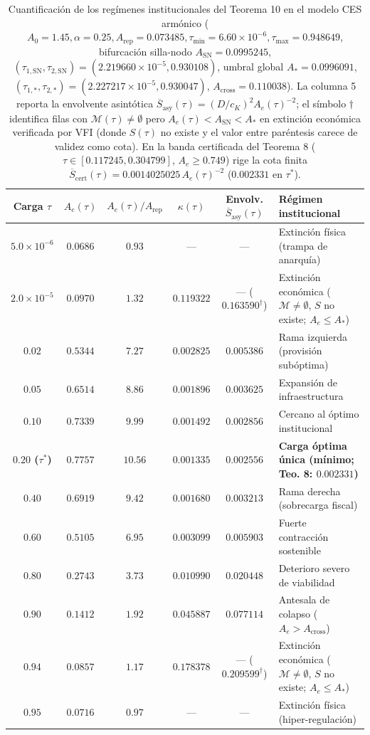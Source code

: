 \documentclass[11pt,letterpaper]{article}
\theoremstyle{plain}
\begin{document}
\begin{table}[htbp]
\centering
\small
\begin{tabular}{@{}cccccl@{}}
\toprule
\textbf{Carga $\tau$} & $A_e(\tau)$ & $A_e(\tau)/A_{\mathrm{rep}}$ & $\kappa(\tau)$ & \textbf{Envolv. $\overline{S}_{\mathrm{asy}}(\tau)$} & \textbf{Régimen institucional} \\
\midrule
$5.0\times 10^{-6}$ & $0.0686$ & $0.93$ & --- & --- & Extinción física (trampa de anarquía) \\
$2.0\times 10^{-5}$ & $0.0970$ & $1.32$ & $0.119322$ & --- ($0.163590^\dagger$) & Extinción económica ($\mathcal{M}\neq\emptyset$, $S$ no existe; $A_e\le A_*$) \\
$0.02$ & $0.5344$ & $7.27$ & $0.002825$ & $0.005386$ & Rama izquierda (provisión subóptima) \\
$0.05$ & $0.6514$ & $8.86$ & $0.001896$ & $0.003625$ & Expansión de infraestructura \\
$0.10$ & $0.7339$ & $9.99$ & $0.001492$ & $0.002856$ & Cercano al óptimo institucional \\
\textbf{$0.20$ ($\tau^*$)} & \textbf{$0.7757$} & \textbf{$10.56$} & \textbf{$0.001335$} & \textbf{$0.002556$} & \textbf{Carga óptima única (mínimo; Teo. 8: $0.002331$)} \\
$0.40$ & $0.6919$ & $9.42$ & $0.001680$ & $0.003213$ & Rama derecha (sobrecarga fiscal) \\
$0.60$ & $0.5105$ & $6.95$ & $0.003099$ & $0.005903$ & Fuerte contracción sostenible \\
$0.80$ & $0.2743$ & $3.73$ & $0.010990$ & $0.020448$ & Deterioro severo de viabilidad \\
$0.90$ & $0.1412$ & $1.92$ & $0.045887$ & $0.077114$ & Antesala de colapso ($A_e > A_{\mathrm{cross}}$) \\
$0.94$ & $0.0857$ & $1.17$ & $0.178378$ & --- ($0.209599^\dagger$) & Extinción económica ($\mathcal{M}\neq\emptyset$, $S$ no existe; $A_e\le A_*$) \\
$0.95$ & $0.0716$ & $0.97$ & --- & --- & Extinción física (hiper-regulación) \\
\bottomrule
\end{tabular}
\caption{Cuantificación de los regímenes institucionales del Teorema 10 en el modelo CES armónico ($A_0=1.45,\alpha=0.25,A_{\mathrm{rep}}=0.073485,\tau_{\min}=6.60\times 10^{-6},\tau_{\max}=0.948649$, bifurcación silla-nodo $A_{\mathrm{SN}}=0.0995245$, $(\tau_{1,\mathrm{SN}},\tau_{2,\mathrm{SN}})=(2.219660\times 10^{-5}, 0.930108)$, umbral global $A_*=0.0996091$, $(\tau_{1,*},\tau_{2,*})=(2.227217\times 10^{-5}, 0.930047)$, $A_{\mathrm{cross}}=0.110038$). La columna 5 reporta la envolvente asintótica $\overline{S}_{\mathrm{asy}}(\tau)=(D/c_K)^2 A_e(\tau)^{-2}$; el símbolo $\dagger$ identifica filas con $\mathcal{M}(\tau)\neq\emptyset$ pero $A_e(\tau)<A_{\mathrm{SN}}<A_*$ en extinción económica verificada por VFI (donde $S(\tau)$ no existe y el valor entre paréntesis carece de validez como cota). En la banda certificada del Teorema 8 ($\tau\in[0.117245, 0.304799]$, $A_e\ge 0.749$) rige la cota finita $\overline{S}_{\mathrm{cert}}(\tau)=0.0014025025\,A_e(\tau)^{-2}$ ($0.002331$ en $\tau^*$).}
\end{table}
\end{document}
